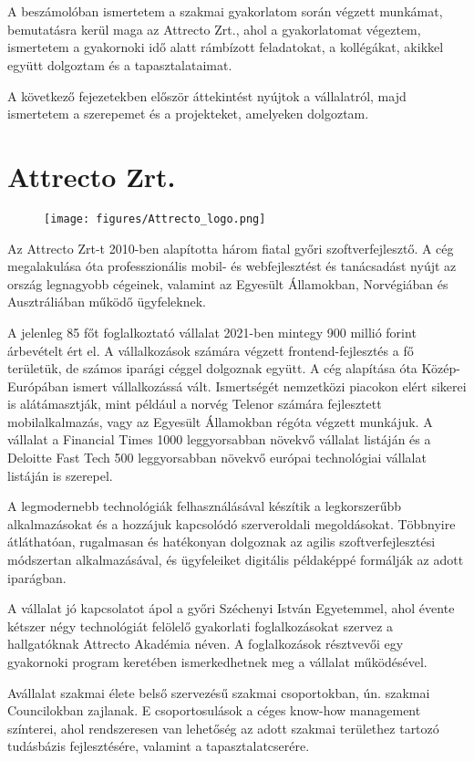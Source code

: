 \section*{\bevezetes}

A beszámolóban ismertetem a szakmai gyakorlatom során végzett munkámat, bemutatásra kerül maga az Attrecto Zrt., ahol a gyakorlatomat végeztem, ismertetem a gyakornoki idő alatt rámbízott feladatokat, a kollégákat, akikkel együtt dolgoztam és a tapasztalataimat.
\par A következő fejezetekben először áttekintést nyújtok a vállalatról, majd ismertetem a szerepemet és a projekteket, amelyeken dolgoztam.

\section*{Attrecto Zrt.}
\begin{figure}[H]
    \centering
    \texttt{[image: figures/Attrecto\_logo.png]}
\end{figure}
\par Az Attrecto Zrt-t 2010-ben alapította három fiatal győri szoftverfejlesztő. A cég megalakulása óta professzionális mobil- és webfejlesztést és tanácsadást nyújt az ország legnagyobb cégeinek, valamint az Egyesült Államokban, Norvégiában és Ausztráliában működő ügyfeleknek. 

\par A jelenleg 85 főt foglalkoztató vállalat 2021-ben mintegy 900 millió forint árbevételt ért el. A vállalkozások számára végzett frontend-fejlesztés a fő területük, de számos iparági céggel dolgoznak együtt. A cég alapítása óta Közép-Európában ismert vállalkozássá vált. Ismertségét nemzetközi piacokon elért sikerei is alátámasztják, mint például a norvég Telenor számára fejlesztett mobilalkalmazás, vagy az Egyesült Államokban régóta végzett munkájuk. A vállalat a Financial Times 1000 leggyorsabban növekvő vállalat listáján és a Deloitte Fast Tech 500 leggyorsabban növekvő európai technológiai vállalat listáján is szerepel.

A legmodernebb technológiák felhasználásával készítik a legkorszerűbb alkalmazásokat és a hozzájuk kapcsolódó szerveroldali megoldásokat. Többnyire átláthatóan, rugalmasan és hatékonyan dolgoznak az agilis szoftverfejlesztési módszertan alkalmazásával, és ügyfeleiket digitális példaképpé formálják az adott iparágban.
\par A vállalat jó kapcsolatot ápol a győri Széchenyi István Egyetemmel, ahol évente kétszer négy technológiát felölelő gyakorlati foglalkozásokat szervez a hallgatóknak Attrecto Akadémia néven. A foglalkozások résztvevői egy gyakornoki program keretében ismerkedhetnek meg a vállalat működésével.
\par Avállalat szakmai élete belső szervezésű szakmai csoportokban, ún. szakmai Councilokban zajlanak. E csoportosulások a céges know-how management színterei, ahol rendszeresen van lehetőség az adott szakmai területhez tartozó tudásbázis fejlesztésére, valamint a tapasztalatcserére.
